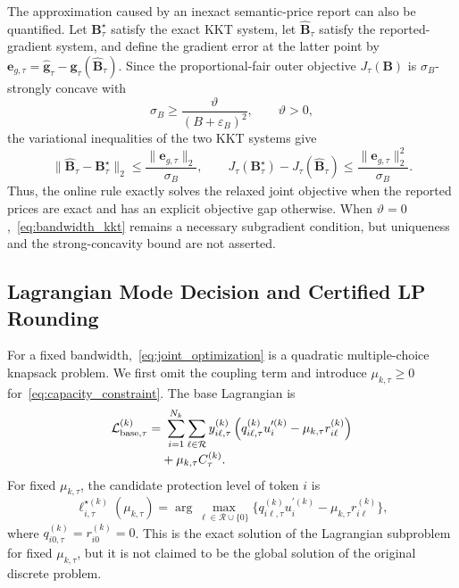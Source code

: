 \documentclass[journal]{IEEEtran}
\begin{document}
The approximation caused by an inexact semantic-price report can also be quantified. Let $\bm B_{\tau}^{\star}$ satisfy the exact KKT system, let $\widehat{\bm B}_{\tau}$ satisfy the reported-gradient system, and define the gradient error at the latter point by $\bm e_{g,\tau}=\widehat{\bm g}_{\tau}-\bm g_{\tau}(\widehat{\bm B}_{\tau})$. Since the proportional-fair outer objective $J_{\tau}(\bm B)$ is $\sigma_B$-strongly concave with
\begin{equation}
\sigma_B\geq\frac{\vartheta}{(B+\varepsilon_B)^2},
\qquad \vartheta>0,
\label{eq:bandwidth_strong_concavity}
\end{equation}
the variational inequalities of the two KKT systems give
\begin{equation}
\|\widehat{\bm B}_{\tau}-\bm B_{\tau}^{\star}\|_2
\leq\frac{\|\bm e_{g,\tau}\|_2}{\sigma_B},
\qquad
J_{\tau}(\bm B_{\tau}^{\star})-J_{\tau}(\widehat{\bm B}_{\tau})
\leq\frac{\|\bm e_{g,\tau}\|_2^2}{\sigma_B}.
\label{eq:bandwidth_report_gap}
\end{equation}
Thus, the online rule exactly solves the relaxed joint objective when the reported prices are exact and has an explicit objective gap otherwise. When $\vartheta=0$,~\eqref{eq:bandwidth_kkt} remains a necessary subgradient condition, but uniqueness and the strong-concavity bound are not asserted.

\subsection{Lagrangian Mode Decision and Certified LP Rounding}

For a fixed bandwidth,~\eqref{eq:joint_optimization} is a quadratic multiple-choice knapsack problem. We first omit the coupling term and introduce $\mu_{k,\tau}\geq0$ for~\eqref{eq:capacity_constraint}. The base Lagrangian is
\begin{align}
\mathcal L_{\mathrm{base},\tau}^{(k)}
=&~\sum_{i=1}^{N_k}\sum_{\ell\in\mathcal R}
y_{i\ell,\tau}^{(k)}
\left(q_{i\ell,\tau}^{(k)}u_i^{\prime(k)}
-\mu_{k,\tau}r_{i\ell}^{(k)}\right)
\notag\\[-0.2em]
&+\mu_{k,\tau}C_{\tau}^{(k)}.
\label{eq:base_lagrangian}
\end{align}
For fixed $\mu_{k,\tau}$, the candidate protection level of token $i$ is
\begin{equation}
\ell_{i,\tau}^{\star(k)}(\mu_{k,\tau})
=\arg\max_{\ell\in\mathcal R\cup\{0\}}
\{q_{i\ell,\tau}^{(k)}u_i^{\prime(k)}
-\mu_{k,\tau}r_{i\ell}^{(k)}\},
\label{eq:mode_decision}
\end{equation}
where $q_{i0,\tau}^{(k)}=r_{i0}^{(k)}=0$. This is the exact solution of the Lagrangian subproblem for fixed $\mu_{k,\tau}$, but it is not claimed to be the global solution of the original discrete problem.
\end{document}
